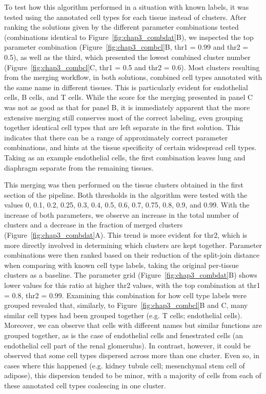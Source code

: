 To test how this algorithm performed in a situation with known labels, it was tested using the annotated cell types for each tissue instead of clusters. After ranking the solutions given by the different parameter combinations tested (combinations identical to Figure~\ref{fig:chap3_combdat}B), we inspected the top parameter combination (Figure~\ref{fig:chap3_combcl}B, thr1 = 0.99 and thr2 = 0.5), as well as the third, which presented the lowest combined cluster number (Figure~\ref{fig:chap3_combcl}C, thr1 = 0.5 and thr2 = 0.6). Most clusters resulting from the merging workflow, in both solutions, combined cell types annotated with the same name in different tissues. This is particularly evident for endothelial cells, B cells, and T cells. While the score for the merging  presented in panel C was not as good as that for panel B, it is immediately apparent that the more extensive merging still conserves most of the correct labeling, even grouping together identical cell types that are left separate in the first solution. This indicates that there can be a range of approximately correct parameter combinations, and hints at the tissue specificity of certain widespread cell types. Taking as an example endothelial cells, the first combination leaves lung and diaphragm separate from the remaining tissues.

This merging was then performed on the tissue clusters obtained in the first section of the pipeline. Both thresholds in the algorithm were tested with the values 0, 0.1, 0.2, 0.25, 0.3, 0.4, 0.5, 0.6, 0.7, 0.75, 0.8, 0.9, and 0.99. With the increase of both parameters, we observe an increase in the total number of clusters and a decrease in the fraction of merged clusters (Figure~\ref{fig:chap3_combdat}A). This trend is more evident for thr2, which is more directly involved in determining which clusters are kept together. Parameter combinations were then ranked based on their reduction of the split-join distance when comparing with known cell type labels, taking the original per-tissue clusters as a baseline. The parameter grid (Figure~\ref{fig:chap3_combdat}B) shows lower values for this ratio at higher thr2 values, with the top combination at thr1 = 0.8, thr2 = 0.99. Examining this combination for how cell type labels were grouped revealed that, similarly, to Figure~\ref{fig:chap3_combcl}B and C, many similar cell types had been grouped together (e.g. T cells; endothelial cells). Moreover, we can observe that cells with different names but similar functions are grouped together, as is the case of endothelial cells and fenestrated cells (an endothelial cell part of the renal glomerulus). In contrast, however, it could be observed that some cell types dispersed across more than one cluster. Even so, in cases where this happened (e.g. kidney tubule cell; mesenchymal stem cell of adipose), this dispersion tended to be minor, with a majority of cells from each of these annotated cell types coalescing in one cluster.

